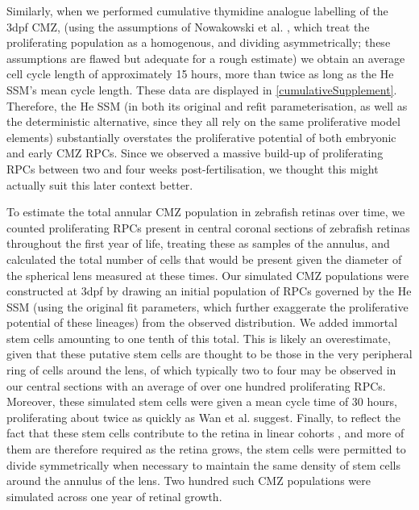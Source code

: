 \documentclass{ut-thesis}
\begin{document}
\begin{NoHyper}
Similarly, when we performed cumulative thymidine analogue labelling of the 3dpf CMZ, (using the assumptions of Nowakowski et al. \cite{Nowakowski1989}, which treat the proliferating population as a homogenous, and dividing asymmetrically; these assumptions are flawed but adequate for a rough estimate) we obtain an average cell cycle length of approximately 15 hours, more than twice as long as the He SSM's mean cycle length. These data are displayed in \ref{cumulativeSupplement}. Therefore, the He SSM (in both its original and refit parameterisation, as well as the deterministic alternative, since they all rely on the same proliferative model elements) substantially overstates the proliferative potential of both embryonic and early CMZ RPCs. Since we observed a massive build-up of proliferating RPCs between two and four weeks post-fertilisation, we thought this might actually suit this later context better.

To estimate the total annular CMZ population in zebrafish retinas over time, we counted proliferating RPCs present in central coronal sections of zebrafish retinas throughout the first year of life, treating these as samples of the annulus, and calculated the total number of cells that would be present given the diameter of the spherical lens measured at these times. Our simulated CMZ populations were constructed at 3dpf by drawing an initial population of RPCs governed by the He SSM (using the original fit parameters, which further exaggerate the proliferative potential of these lineages) from the observed distribution. We added immortal stem cells amounting to one tenth of this total. This is likely an overestimate, given that these putative stem cells are thought to be those in the very peripheral ring of cells around the lens, of which typically two to four may be observed in our central sections with an average of over one hundred proliferating RPCs. Moreover, these simulated stem cells were given a mean cycle time of 30 hours, proliferating about twice as quickly as Wan et al. suggest. Finally, to reflect the fact that these stem cells contribute to the retina in linear cohorts \cite{Centanin2014}, and more of them are therefore required as the retina grows, the stem cells were permitted to divide symmetrically when necessary to maintain the same density of stem cells around the annulus of the lens. Two hundred such CMZ populations were simulated across one year of retinal growth.


\end{NoHyper}
\end{document}
